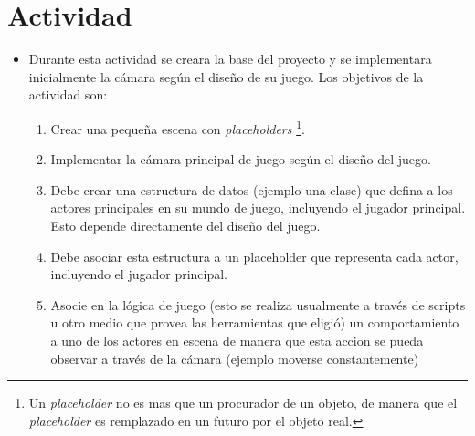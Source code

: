 \section{Actividad}
\begin{itemize}
\item Durante esta actividad se creara la base del proyecto y se implementara inicialmente la cámara según el diseño de su juego. Los objetivos de la actividad son:
\begin{enumerate}
  \item Crear una pequeña escena con \emph{placeholders} \footnote{Un \emph{placeholder} no es mas que un procurador de un objeto, de manera que el \emph{placeholder} es remplazado en un futuro por el objeto real.}.
  \item Implementar la cámara principal de juego según el diseño del juego.
  \item Debe crear una estructura de datos (ejemplo una clase) que defina a los actores principales en su mundo de juego, incluyendo el jugador principal. Esto depende directamente del diseño del juego.
  \item Debe asociar esta estructura a un placeholder que representa cada actor, incluyendo el jugador principal.
  \item Asocie en la lógica de juego (esto se realiza usualmente a través de scripts u otro medio que provea las herramientas que eligió) un comportamiento a uno de los actores en escena de manera que esta accion se pueda observar a través de la cámara (ejemplo moverse constantemente)
\end{enumerate}
\end{itemize}
